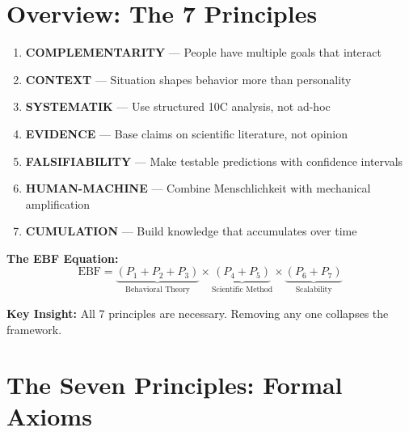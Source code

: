 \section{Overview: The 7 Principles}
\label{sec:pr-overview}

\begin{tcolorbox}[colback=green!10!white, colframe=green!75!black,
    title=\textbf{The 7 Fundamental Principles of EBF}]

\begin{enumerate}
    \item[\textbf{P1}] \textbf{COMPLEMENTARITY} --- People have multiple goals that interact
    \item[\textbf{P2}] \textbf{CONTEXT} --- Situation shapes behavior more than personality
    \item[\textbf{P3}] \textbf{SYSTEMATIK} --- Use structured 10C analysis, not ad-hoc
    \item[\textbf{P4}] \textbf{EVIDENCE} --- Base claims on scientific literature, not opinion
    \item[\textbf{P5}] \textbf{FALSIFIABILITY} --- Make testable predictions with confidence intervals
    \item[\textbf{P6}] \textbf{HUMAN-MACHINE} --- Combine Menschlichkeit with mechanical amplification
    \item[\textbf{P7}] \textbf{CUMULATION} --- Build knowledge that accumulates over time
\end{enumerate}

\vspace{0.5em}
\textbf{The EBF Equation:}
\begin{equation}
\text{EBF} = \underbrace{(P_1 + P_2 + P_3)}_{\text{Behavioral Theory}} \times \underbrace{(P_4 + P_5)}_{\text{Scientific Method}} \times \underbrace{(P_6 + P_7)}_{\text{Scalability}}
\end{equation}

\textbf{Key Insight:} All 7 principles are necessary. Removing any one collapses the framework.

\end{tcolorbox}


\section{The Seven Principles: Formal Axioms}
\label{sec:pr-principles}

